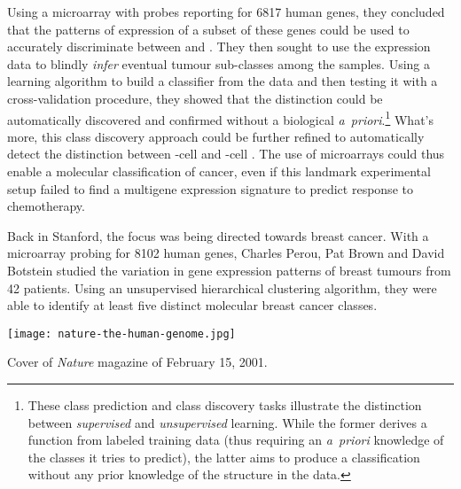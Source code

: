 Using a microarray with probes reporting for 6817 human genes, they concluded
that the patterns of expression of a subset of these genes could be used to
accurately discriminate between  and .  They then
sought to use the expression data to blindly \emph{infer} eventual tumour
\mbox{sub-classes} among the samples.  Using a learning algorithm to build a
classifier from the data and then testing it with a cross-validation procedure,
they showed that the \mbox{} distinction could be
automatically discovered and confirmed without a biological \mbox{\emph{a
    priori}}.\footnote{These class prediction and class discovery tasks
  illustrate the distinction between \emph{supervised} and \emph{unsupervised}
  learning.  While the former derives a function from labeled training data
  (thus requiring an \mbox{\emph{a priori}} knowledge of the classes it tries to
  predict), the latter aims to produce a classification without any prior
  knowledge of the structure in the data.}  What's more, this class discovery
approach could be further refined to automatically detect the distinction
between \mbox{-cell} and \mbox{-cell} .
The use of microarrays could thus enable a molecular classification of cancer,
even if this landmark experimental setup failed to find a multigene expression
signature to predict response to chemotherapy.

Back in Stanford, the focus was being directed towards breast cancer.  With a
microarray probing for \num{8102} human genes, Charles Perou, Pat Brown and
David Botstein studied the variation in gene expression patterns of breast
tumours from 42 patients.\cite{perou_molecular_2000} Using an unsupervised
hierarchical clustering algorithm, they were able to identify at least five
distinct molecular breast cancer classes.

\begin{marginfigure}%
  \texttt{[image: nature-the-human-genome.jpg]}
  \caption[Cover of \emph{Nature} magazine of February 15, 2001]{Cover of
    \emph{Nature} magazine of February 15, 2001.}
  \label{fig:human-genome-cover}
\end{marginfigure}

